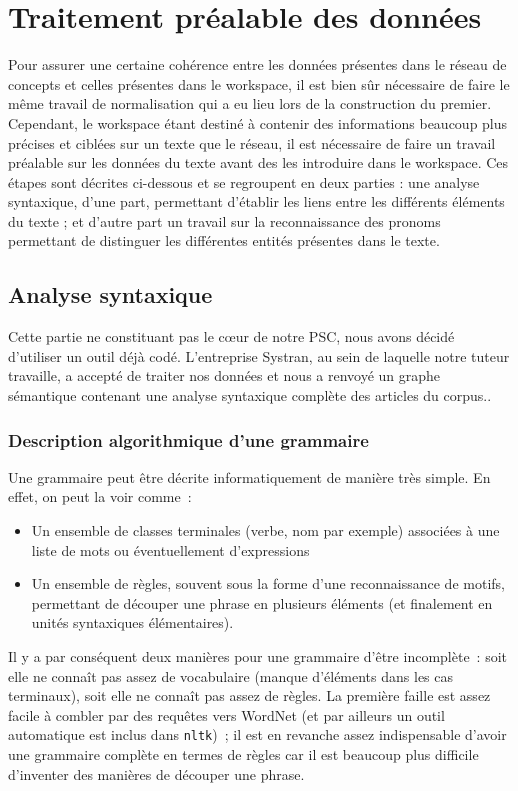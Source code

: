\documentclass[a4paper, 12pt]{article}
\newcommand{\pyt}[1]{\texttt{#1}}%
\begin{document}
\section{Traitement préalable des données}

Pour assurer une certaine cohérence entre les données présentes dans le réseau de concepts et celles présentes dans le workspace, il est bien sûr nécessaire de faire le même travail de normalisation qui a eu lieu lors de la construction du premier. Cependant, le workspace étant destiné à contenir des informations beaucoup plus précises et ciblées sur un texte que le réseau, il est nécessaire de faire un travail préalable sur les données du texte avant des les introduire dans le workspace. Ces étapes sont décrites ci-dessous et se regroupent en deux parties : une analyse syntaxique, d'une part, permettant d'établir les liens entre les différents éléments du texte ; et d'autre part un travail sur la reconnaissance des pronoms permettant de distinguer les différentes entités présentes dans le texte.

\subsection{Analyse syntaxique}

Cette partie ne constituant pas le c\oe{}ur de notre PSC, nous avons décidé d'utiliser un outil déjà codé. L'entreprise Systran, au sein de laquelle notre tuteur travaille, a accepté de traiter nos données et nous a renvoyé un graphe sémantique contenant une analyse syntaxique complète des articles du corpus..

\subsubsection{Description algorithmique d'une grammaire}
Une grammaire peut être décrite informatiquement de manière très simple. En effet, on peut la voir comme~:
\begin{itemize}
	\item Un ensemble de classes terminales (verbe, nom par exemple) associées à une liste de mots ou éventuellement d'expressions
	\item Un ensemble de règles, souvent sous la forme d'une reconnaissance de motifs, permettant de découper une phrase en plusieurs éléments (et finalement en unités syntaxiques élémentaires).
\end{itemize}

Il y a par conséquent deux manières pour une grammaire d'être incomplète~: soit elle ne connaît pas assez de vocabulaire (manque d'éléments dans les cas terminaux), soit elle ne connaît pas assez de règles. La première faille est assez facile à combler par des requêtes vers WordNet (et par ailleurs un outil automatique est inclus dans \pyt{nltk})~; il est en revanche assez indispensable d'avoir une grammaire complète en termes de règles car il est beaucoup plus difficile d'inventer des manières de découper une phrase.
\end{document}
